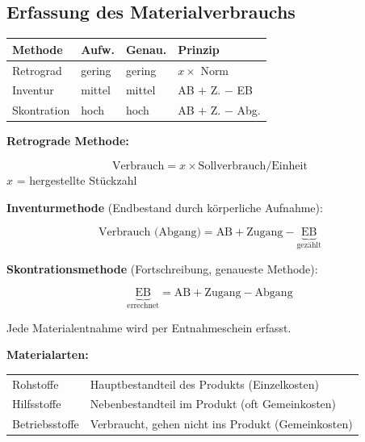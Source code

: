 \documentclass[10pt,a4paper]{article}
\begin{document}
\begin{multicols}{2}

\subsection{Erfassung des Materialverbrauchs}

\begin{tabular}{|L{2.2cm}|L{1.3cm}|L{1.3cm}|L{2cm}|}
\hline
{}
\textbf{Methode} & \textbf{Aufw.} & \textbf{Genau.} & \textbf{Prinzip} \\
\hline
Retrograd & gering & gering & $x \times$ Norm \\
Inventur & mittel & mittel & AB $+$ Z. $-$ EB \\
Skontration & hoch & hoch & AB $+$ Z. $-$ Abg. \\
\hline
\end{tabular}

\vspace{4pt}
\textbf{Retrograde Methode:}
\begin{formelbox}
\[\text{Verbrauch} = x \times \text{Sollverbrauch/Einheit}\]
\footnotesize $x$ = hergestellte Stückzahl
\end{formelbox}

\textbf{Inventurmethode} (Endbestand durch körperliche Aufnahme):
\begin{formelbox}
\[\text{Verbrauch (Abgang)} = \text{AB} + \text{Zugang} - \underbrace{\text{EB}}_{\text{gezählt}}\]
\end{formelbox}

\textbf{Skontrationsmethode} (Fortschreibung, genaueste Methode):
\begin{formelbox}
\[\underbrace{\text{EB}}_{\text{errechnet}} = \text{AB} + \text{Zugang} - \text{Abgang}\]
\end{formelbox}
Jede Materialentnahme wird per Entnahmeschein erfasst.

\textbf{Materialarten:}\par
\begin{tabular}{|L{1.9cm}|L{4.5cm}|}
\hline
Rohstoffe & Hauptbestandteil des Produkts (Einzelkosten) \\
Hilfsstoffe & Nebenbestandteil im Produkt (oft Gemeinkosten) \\
Betriebsstoffe & Verbraucht, gehen nicht ins Produkt (Gemeinkosten) \\
\hline
\end{tabular}

\columnbreak


\end{multicols}
\end{document}
